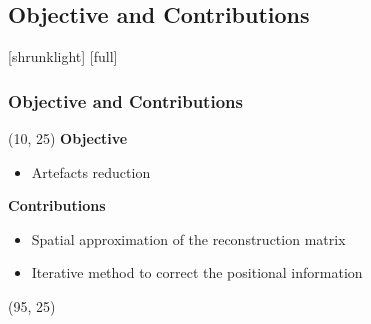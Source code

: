 \documentclass[14pt,compress,aspectratio=169]{beamer} %
\begin{document}
\begin{frame}[t]
\begin{textblock}{50}
\begin{overprint}
	\end{overprint}
	\end{textblock}
	
\end{frame}


\subsection{Objective and Contributions}
[shrunklight]
[full]
\begin{frame}[t]
\frametitle{Objective and Contributions}
	\begin{textblock}{80}(10, 25) %
	\textbf{Objective} 	
	\begin{itemize}
		\item Artefacts reduction
	\end{itemize}
	\vspace*{0.2cm}
	
	\textbf{Contributions}
	\begin{itemize}
		\item Spatial approximation of the reconstruction matrix
		\item Iterative method to correct the positional information
	\end{itemize}
	\end{textblock}
	
	\begin{textblock}{50}(95, 25)
	\centering
	\begin{overprint}
	\end{overprint}
	\end{textblock}
	
\end{frame}
\end{document}
